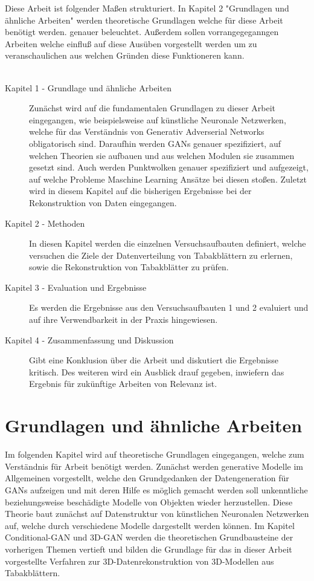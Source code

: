 \documentclass{llncs}
\begin{document}
Diese Arbeit ist folgender Maßen strukturiert. In Kapitel 2 "Grundlagen und ähnliche Arbeiten" werden theoretische Grundlagen welche für diese Arbeit benötigt werden. genauer beleuchtet. Außerdem sollen vorrangegeganngen Arbeiten welche einfluß auf diese Ausüben vorgestellt werden um zu veranschaulichen aus welchen Gründen diese Funktioneren kann.
\\\\
\begin{description}
\item[Kapitel 1 - Grundlage und ähnliche Arbeiten] Zunächst wird auf die fundamentalen Grundlagen zu dieser Arbeit eingegangen, wie beispielsweise auf künstliche Neuronale Netzwerken, welche für das Verständnis von Generativ Adverserial Networks obligatorisch sind. Daraufhin werden GANs genauer spezifiziert, auf welchen Theorien sie aufbauen und aus welchen Modulen sie zusammen gesetzt sind. Auch werden Punktwolken genauer spezifiziert und aufgezeigt, auf welche Probleme Maschine Learning Ansätze bei diesen stoßen. Zuletzt wird in diesem Kapitel auf die bisherigen Ergebnisse bei der Rekonstruktion von Daten eingegangen. 

\item[Kapitel 2 - Methoden] In diesen Kapitel werden die einzelnen Versuchsaufbauten definiert, welche versuchen die Ziele der Datenverteilung von Tabakblättern zu erlernen, sowie die Rekonstruktion von Tabakblätter zu prüfen.
\item[Kapitel 3 - Evaluation und Ergebnisse] Es werden die Ergebnisse aus den Versuchsaufbauten 1 und 2 evaluiert und auf ihre Verwendbarkeit in der Praxis hingewiesen. 

\item[Kapitel 4 - Zusammenfassung und Diskussion] Gibt eine Konklusion über die Arbeit und diskutiert die Ergebnisse kritisch. Des weiteren wird ein Ausblick drauf gegeben, inwiefern das Ergebnis für zukünftige Arbeiten von Relevanz ist. 
\end{description}

\section{Grundlagen und ähnliche Arbeiten}

Im folgenden Kapitel wird auf theoretische Grundlagen eingegangen, welche zum Verständnis für Arbeit benötigt werden. Zunächst werden  generative Modelle im Allgemeinen vorgestellt, welche den Grundgedanken der Datengeneration für GANs aufzeigen und mit deren Hilfe es möglich gemacht werden soll unkenntliche beziehungsweise beschädigte Modelle von Objekten wieder herzustellen. Diese Theorie baut zunächst auf Datenstruktur von künstlichen Neuronalen Netzwerken auf, welche durch verschiedene Modelle dargestellt werden können. Im Kapitel Conditional-GAN und 3D-GAN werden die theoretischen Grundbausteine der vorherigen Themen vertieft und bilden die Grundlage für das in dieser Arbeit vorgestellte Verfahren zur 3D-Datenrekonstruktion von 3D-Modellen aus Tabakblättern. 
\end{document}
